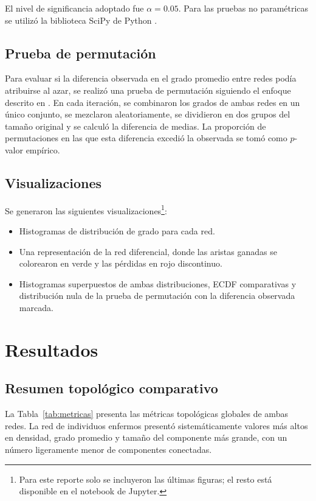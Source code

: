 \documentclass[conference]{IEEEtran}
\begin{document}
El nivel de significancia adoptado fue $\alpha = 0.05$. Para las pruebas no paramétricas se utilizó la biblioteca SciPy de Python \cite{virtanen2020}.

\subsection{Prueba de permutación}

Para evaluar si la diferencia observada en el grado promedio entre redes podía atribuirse al azar, se realizó una prueba de permutación siguiendo el enfoque descrito en \cite{jardim2019}. En cada iteración, se combinaron los grados de ambas redes en un único conjunto, se mezclaron aleatoriamente, se dividieron en dos grupos del tamaño original y se calculó la diferencia de medias. La proporción de permutaciones en las que esta diferencia excedió la observada se tomó como $p$-valor empírico.

\subsection{Visualizaciones}

Se generaron las siguientes visualizaciones\footnote{Para este reporte solo se incluyeron las últimas figuras; el resto está disponible en el notebook de Jupyter.}:

\begin{itemize}[leftmargin=*]
    \item Histogramas de distribución de grado para cada red.
    \item Una representación de la red diferencial, donde las aristas ganadas se colorearon en verde y las pérdidas en rojo discontinuo.
    \item Histogramas superpuestos de ambas distribuciones, ECDF comparativas y distribución nula de la prueba de permutación con la diferencia observada marcada.
\end{itemize}

\section{Resultados}

\subsection{Resumen topológico comparativo}

La Tabla~\ref{tab:metricas} presenta las métricas topológicas globales de ambas redes. La red de individuos enfermos presentó sistemáticamente valores más altos en densidad, grado promedio y tamaño del componente más grande, con un número ligeramente menor de componentes conectadas.
\end{document}
